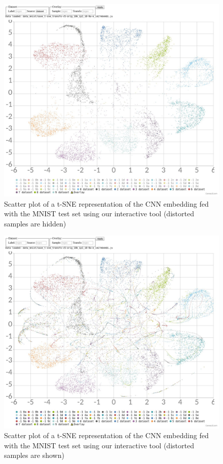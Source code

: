 \documentclass[a4paper,12pt]{report}
\begin{document}
\begin{figure}[t]
    \begin{center}
        \includegraphics[width=\textwidth]{thesis_figures/mnist_nda_tsne.jpg}
    \end{center}
    \caption{Scatter plot of a t-SNE representation of the CNN embedding fed with the MNIST test set using our interactive tool (distorted samples are hidden)}
    \label{fig:mnist_nda_tsne}
\end{figure}

\begin{figure}[t]
    \begin{center}
        \includegraphics[width=\textwidth]{thesis_figures/mnist_nda_tsne2.jpg}
    \end{center}
    \caption{Scatter plot of a t-SNE representation of the CNN embedding fed with the MNIST test set using our interactive tool (distorted samples are shown)}
    \label{fig:mnist_nda_tsne2}
\end{figure}
\end{document}

